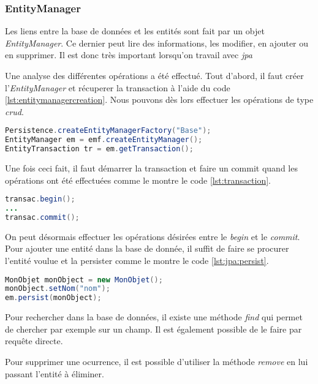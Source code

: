 \subsubsection{EntityManager}
Les liens entre la base de données et les entités sont fait par un objet \emph{EntityManager}. Ce dernier peut lire des informations, les modifier, en ajouter ou en supprimer. Il est donc très important lorsqu'on travail avec \emph{\gls{jpa}}

\medskip

Une analyse des différentes opérations a été effectué. Tout d'abord, il faut créer l'\emph{EntityManager} et récuperer la transaction à l'aide du code \ref{lst:entitymanagercreation}. Nous pouvons dès lors effectuer les opérations de type \emph{\gls{crud}}.

\begin{lstlisting}[language={JAVA}, caption={JPA - Création d'une EntityManager}, label={lst:entitymanagercreation}]
Persistence.createEntityManagerFactory("Base");   
EntityManager em = emf.createEntityManager();   
EntityTransaction tr = em.getTransaction();
\end{lstlisting}

Une fois ceci fait, il faut démarrer la transaction et faire un commit quand les opérations ont été effectuées comme le montre le code \ref{lst:transaction}.

\begin{lstlisting}[language={JAVA}, caption={JPA - Gestion de la transaction}, label={lst:transaction}]
transac.begin();
...
transac.commit();
\end{lstlisting}

On peut désormais effectuer les opérations désirées entre le \emph{begin} et le \emph{commit}. Pour ajouter une entité dans la base de donnée, il suffit de faire se procurer l'entité voulue et la persister comme le montre le code \ref{lst:jpa:persist}.

\begin{lstlisting}[language={JAVA}, caption={JPA - Persist}, label={lst:jpa:persist}]
MonObjet monObject = new MonObjet();
monObject.setNom("nom");
em.persist(monObject);
\end{lstlisting}

Pour rechercher dans la base de données, il existe une méthode \emph{find} qui permet de chercher par exemple sur un champ. Il est également possible de le faire par requête directe.

\medskip

Pour supprimer une ocurrence, il est possible d'utiliser la méthode \emph{remove} en lui passant l'entité à éliminer.


